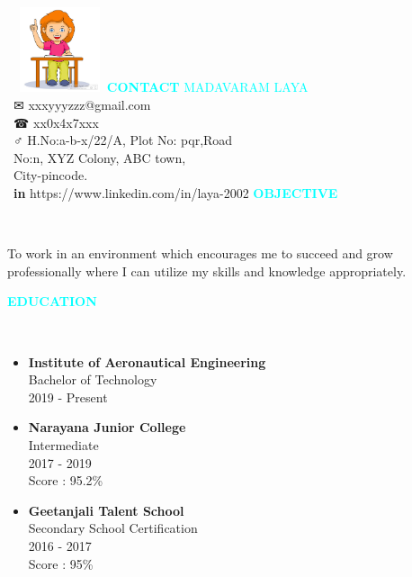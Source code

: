 \documentclass{article}
\begin{document}
~\hspace{12cm} \includegraphics[width=2.5cm,height=2.5cm]{Myimg}
\textcolor{cyan}{\textbf{CONTACT} \hspace{3.5cm}MADAVARAM LAYA}
\\
\vspace{2mm}
~\hspace{5.1cm}✉ xxxyyyzzz@gmail.com
\\
\vspace{1mm}
~\hspace{5.1cm}☎ xx0x4x7xxx
\\ 
\vspace{1mm}
~\hspace{5.1cm}♂️ H.No:a-b-x/22/A, Plot No: pqr,Road 
\\
\vspace{1mm}
~\hspace{5.5cm}No:n, XYZ Colony, ABC town, 
\\
\vspace{1mm}
~\hspace{5.5cm}City-pincode.
\\
\vspace{1mm} 
~\hspace{5.1cm}\textbf{in} 
https://www.linkedin.com/in/laya-2002
\vspace{5mm}
\textcolor{cyan}{\textbf{OBJECTIVE}}
\hspace{0.5cm}
\\ 
\begin{flushleft}
To work in an environment which encourages me to succeed and grow professionally where I can utilize my skills and knowledge appropriately.
\end{flushleft}
\vspace{5mm}
\textcolor{cyan}{\textbf{EDUCATION}} 
\hspace{0.5cm} 
\\ 
\begin{itemize} 
\item \textbf{Institute of Aeronautical Engineering}\\Bachelor of Technology\\2019 - Present
\item \textbf{Narayana Junior College}\\Intermediate\\2017 - 2019\\Score : 95.2\%
\item \textbf{Geetanjali Talent School}\\Secondary School Certification\\2016 - 2017\\Score : 95\%
\end{itemize} 
\end{document}
